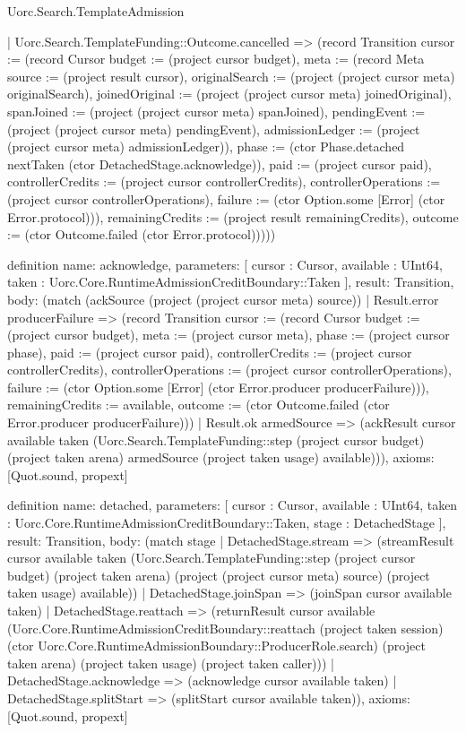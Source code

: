 \begin{lexlean}{Uorc.Search.TemplateAdmission}
\begin{semanticmodule}
{    | Uorc.Search.TemplateFunding::Outcome.cancelled => (record Transition {cursor := (record Cursor {budget := (project cursor budget), meta := (record Meta {source := (project result cursor), originalSearch := (project (project cursor meta) originalSearch), joinedOriginal := (project (project cursor meta) joinedOriginal), spanJoined := (project (project cursor meta) spanJoined), pendingEvent := (project (project cursor meta) pendingEvent), admissionLedger := (project (project cursor meta) admissionLedger)}), phase := (ctor Phase.detached nextTaken (ctor DetachedStage.acknowledge)), paid := (project cursor paid), controllerCredits := (project cursor controllerCredits), controllerOperations := (project cursor controllerOperations), failure := (ctor Option.some [Error] (ctor Error.protocol))}), remainingCredits := (project result remainingCredits), outcome := (ctor Outcome.failed (ctor Error.protocol))})))
}

definition{
  name: acknowledge,
  parameters: [
    cursor : Cursor,
    available : UInt64,
    taken : Uorc.Core.RuntimeAdmissionCreditBoundary::Taken
  ],
  result: Transition,
  body: (match (ackSource (project (project cursor meta) source))
    | Result.error producerFailure => (record Transition {cursor := (record Cursor {budget := (project cursor budget), meta := (project cursor meta), phase := (project cursor phase), paid := (project cursor paid), controllerCredits := (project cursor controllerCredits), controllerOperations := (project cursor controllerOperations), failure := (ctor Option.some [Error] (ctor Error.producer producerFailure))}), remainingCredits := available, outcome := (ctor Outcome.failed (ctor Error.producer producerFailure))})
    | Result.ok armedSource => (ackResult cursor available taken (Uorc.Search.TemplateFunding::step (project cursor budget) (project taken arena) armedSource (project taken usage) available))),
  axioms: [Quot.sound, propext]
}

definition{
  name: detached,
  parameters: [
    cursor : Cursor,
    available : UInt64,
    taken : Uorc.Core.RuntimeAdmissionCreditBoundary::Taken,
    stage : DetachedStage
  ],
  result: Transition,
  body: (match stage
    | DetachedStage.stream => (streamResult cursor available taken (Uorc.Search.TemplateFunding::step (project cursor budget) (project taken arena) (project (project cursor meta) source) (project taken usage) available))
    | DetachedStage.joinSpan => (joinSpan cursor available taken)
    | DetachedStage.reattach => (returnResult cursor available (Uorc.Core.RuntimeAdmissionCreditBoundary::reattach (project taken session) (ctor Uorc.Core.RuntimeAdmissionBoundary::ProducerRole.search) (project taken arena) (project taken usage) (project taken caller)))
    | DetachedStage.acknowledge => (acknowledge cursor available taken)
    | DetachedStage.splitStart => (splitStart cursor available taken)),
  axioms: [Quot.sound, propext]
}


\end{semanticmodule}
\end{lexlean}
